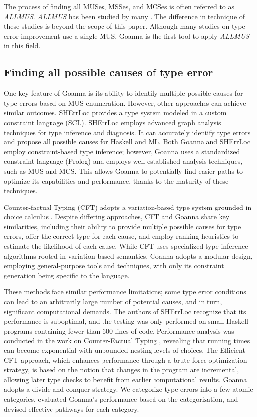 \documentclass[pdflatex,lineno,sn-nature,Numbered]{sn-jnl}%
\begin{document}
The process of finding all MUSes, MSSes, and MCSes is often referred to as \textit{ALLMUS}. {\it ALLMUS} has been studied by many \cite{de-la-Banda2003-jm,Bailey2005-hi,Liffiton2008-mx,Liffiton2016-xi,Zhao2016-bu,Bendik2020-pz}. The difference in technique of these studies is beyond the scope of this paper. Although many studies on type error improvement use a single MUS, Goanna is the first tool to apply \textit{ALLMUS} in this field.


\subsection{Finding all possible causes of type error}
One key feature of Goanna is its ability to identify multiple possible causes for type errors based on MUS enumeration. However, other approaches can achieve similar outcomes. SHErrLoc \cite{Zhang2015-xy} provides a type system modeled in a custom constraint language (SCL). SHErrLoc employs advanced graph analysis techniques for type inference and diagnosis. It can accurately identify type errors and propose all possible causes for Haskell and ML. Both Goanna and SHErrLoc employ constraint-based type inference; however, Goanna uses a standardized constraint language (Prolog) and employs well-established analysis techniques, such as MUS and MCS. This allows Goanna to potentially find easier paths to optimize its capabilities and performance, thanks to the maturity of these techniques.

Counter-factual Typing (CFT) \cite{Chen2014-dz,Chen2020-ad,Chen2022-xb} adopts a variation-based type system grounded in choice calculus \cite{Erwig2011-cc}. Despite differing approaches, CFT and Goanna share key similarities, including their ability to provide multiple possible causes for type errors, offer the correct type for each cause, and employ ranking heuristics to estimate the likelihood of each cause. While CFT uses specialized type inference algorithms rooted in variation-based semantics, Goanna adopts a modular design, employing general-purpose tools and techniques, with only its constraint generation being specific to the language.

These methods face similar performance limitations; some type error conditions can lead to an arbitrarily large number of potential causes, and in turn, significant computational demands. The authors of SHErrLoc recognize that its performance is suboptimal, and the testing was only performed on small Haskell programs containing fewer than 600 lines of code.  Performance analysis was conducted in the work on Counter-Factual Typing \cite{Chen2014-dz}, revealing that running times can become exponential with unbounded nesting levels of choices. The Efficient CFT \cite{Chen2020-ad} approach, which enhances performance through a brute-force optimization strategy,  is based on the notion that changes in the program are incremental, allowing later type checks to benefit from earlier computational results. Goanna adopts a divide-and-conquer strategy. We categorize type errors into a few atomic categories, evaluated Goanna's performance based on the categorization, and devised effective pathways for each category.
\end{document}
